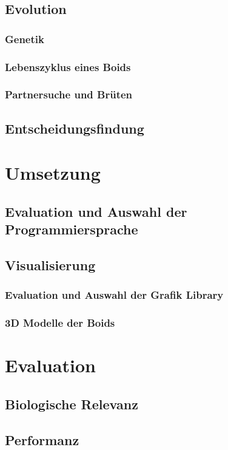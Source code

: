 \documentclass[draft=false
              ,paper=a4
              ,twoside=false
              ,fontsize=11pt
              ,headsepline
              ,BCOR10mm
              ,DIV11
              ,bibtotoc
              ,liststotoc
              ]{scrbook}
\begin{document}
\section{Evolution}
\subsection{Genetik}
\subsection{Lebenszyklus eines Boids}
\subsection{Partnersuche und Brüten}

\section{Entscheidungsfindung}

\chapter{Umsetzung}
\section{Evaluation und Auswahl der Programmiersprache}
\section{Visualisierung}
\subsection{Evaluation und Auswahl der Grafik Library}
\subsection{3D Modelle der Boids}

\chapter{Evaluation}
\section{Biologische Relevanz}
\section{Performanz}
\end{document}
